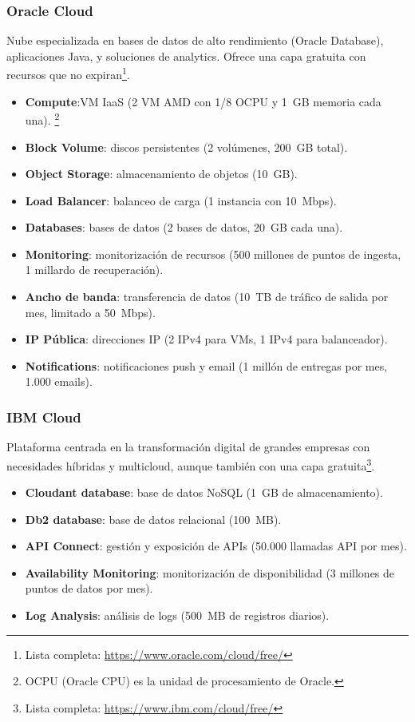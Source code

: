 \subsubsection*{Oracle Cloud}

Nube especializada en bases de datos de alto rendimiento (Oracle Database), aplicaciones Java, y soluciones de analytics. Ofrece una capa gratuita con recursos que no expiran\footnote{Lista completa: \url{https://www.oracle.com/cloud/free/}}.

\begin{itemize}
	\item \textbf{Compute}:VM IaaS (2 VM AMD con 1/8 OCPU y 1~GB memoria cada una). \footnote{OCPU (Oracle CPU) es la unidad de procesamiento de Oracle.}
	\item \textbf{Block Volume}: discos persistentes (2 volúmenes, 200~GB total).
	\item \textbf{Object Storage}: almacenamiento de objetos (10~GB).
	\item \textbf{Load Balancer}: balanceo de carga (1 instancia con 10~Mbps).
	\item \textbf{Databases}: bases de datos (2 bases de datos, 20~GB cada una).
	\item \textbf{Monitoring}: monitorización de recursos (500 millones de puntos de ingesta, 1 millardo de recuperación).
	\item \textbf{Ancho de banda}: transferencia de datos (10~TB de tráfico de salida por mes, limitado a 50~Mbps).
	\item \textbf{IP Pública}: direcciones IP (2 IPv4 para VMs, 1 IPv4 para balanceador).
	\item \textbf{Notifications}: notificaciones push y email (1 millón de entregas por mes, 1.000 emails).
\end{itemize}

\subsubsection*{IBM Cloud}

Plataforma centrada en la transformación digital de grandes empresas con necesidades híbridas y multicloud, aunque también con una capa gratuita\footnote{Lista completa: \url{https://www.ibm.com/cloud/free/}}.

\begin{itemize}
	\item \textbf{Cloudant database}: base de datos NoSQL (1~GB de almacenamiento).
	\item \textbf{Db2 database}: base de datos relacional (100~MB).
	\item \textbf{API Connect}: gestión y exposición de APIs (50.000 llamadas API por mes).
	\item \textbf{Availability Monitoring}: monitorización de disponibilidad (3 millones de puntos de datos por mes).
	\item \textbf{Log Analysis}: análisis de logs (500~MB de registros diarios).
\end{itemize}

